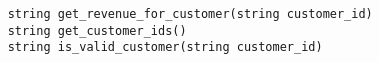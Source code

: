 \begin{verbatim}
    string get_revenue_for_customer(string customer_id)
    string get_customer_ids()
    string is_valid_customer(string customer_id)
\end{verbatim}